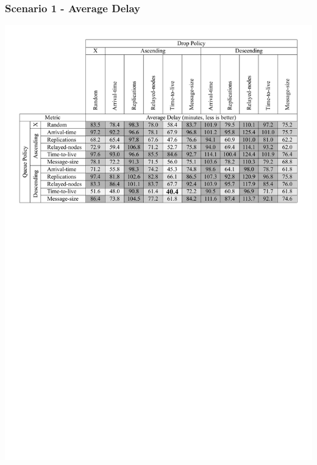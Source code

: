 \begin{frame}
  \frametitle{Scenario 1 - Average Delay}
  \begin{center}
   \includegraphics[width=1.0\textwidth]{fig/tables/scenario1_part3.pdf}
  \end{center}
\end{frame}

